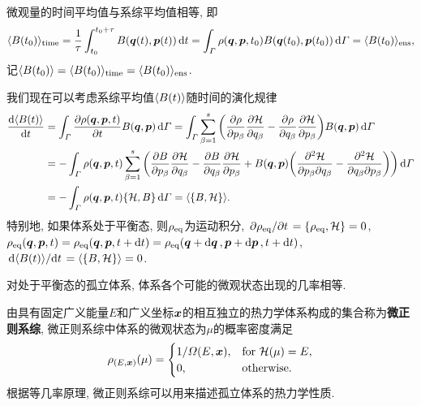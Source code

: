 \begin{postulate}[遍历性假设]\label{pos:遍历性假设}
    微观量的时间平均值与系综平均值相等, 即
    \begin{equation}
        \langle B(t_0) \rangle_{\mathrm{time}} = \frac{1}{\tau} \int_{t_0}^{t_0+\tau} B(\vb*{q}(t),\vb*{p}(t))\dd{t} = \int_{\varGamma} \rho(\vb*{q},\vb*{p},t_0) B(\vb*{q}(t_0),\vb*{p}(t_0)) \dd{\varGamma} = \langle B(t_0) \rangle_{\mathrm{ens}},
    \end{equation}
    记$ \langle B(t_0)\rangle = \langle B(t_0) \rangle_{\mathrm{time}} = \langle B(t_0) \rangle_{\mathrm{ens}} $.
\end{postulate}

我们现在可以考虑系综平均值$ \langle B(t)\rangle $随时间的演化规律
\begin{align*}
    \dv{\avg{B(t)}}{t} &= \int_{\varGamma} \pdv{\rho(\vb*{q},\vb*{p},t)}{t} B(\vb*{q},\vb*{p}) \dd{\varGamma} = \int_{\varGamma} \sum_{\beta=1}^s \bigg(\pdv{\rho}{p_{\beta}} \pdv{\hami}{q_{\beta}} - \pdv{\rho}{q_{\beta}} \pdv{\hami}{p_{\beta}} \bigg) B(\vb*{q},\vb*{p}) \dd{\varGamma}\\
    &=-\int_{\varGamma} \rho(\vb*{q},\vb*{p},t) \sum_{\beta=1}^s \bigg(\pdv{B}{p_{\beta}} \pdv{\hami}{q_{\beta}} - \pdv{B}{q_{\beta}} \pdv{\hami}{p_{\beta}} + B(\vb*{q},\vb*{p})\bigg( \pdv{\hami}{p_{\beta}}{q_{\beta}} - \pdv{\hami}{q_{\beta}}{p_{\beta}} \bigg) \bigg) \dd{\varGamma}\\
    &=-\int_{\varGamma} \rho(\vb*{q},\vb*{p},t) \pb{\hami}{B} \dd{\varGamma} = \avg{\pb{B}{\hami}}.
\end{align*}
特别地, 如果体系处于平衡态, 则$ \rho_{\mathrm{eq}} $为运动积分, $ \pdv*{\rho_{\eqv}}{t}=\pb{\rho_{\eqv}}{\hami}=0 $, $ \rho_{\mathrm{eq}}(\vb*{q},\vb*{p},t)=\rho_{\mathrm{eq}}(\vb*{q},\vb*{p},t+\dd{t})=\rho_{\mathrm{eq}}(\vb*{q}+\dd{\vb*{q}},\vb*{p}+\dd{\vb*{p}},t+\dd{t}) $, $ \dv*{\avg{B(t)}}{t}=\avg{\pb{B}{\hami}}=0 $.

\begin{postulate}[等几率原理]\label{pos:等几率原理}
    对处于平衡态的孤立体系, 体系各个可能的微观状态出现的几率相等.
\end{postulate}

由具有固定广义能量$ E $和广义坐标$ \vb*{x} $的相互独立的热力学体系构成的集合称为\textbf{微正则系综}, 微正则系综中体系的微观状态为$ \mu $的概率密度满足
\begin{equation}
    \rho_{(E,\vb*{x})}(\mu)=
    \begin{cases}
        1/\varOmega(E,\vb*{x}), & \text{for }\mathcal{H}(\mu)=E,\\
        0, & \text{otherwise}.
    \end{cases}
\end{equation}
根据等几率原理, 微正则系综可以用来描述孤立体系的热力学性质.
